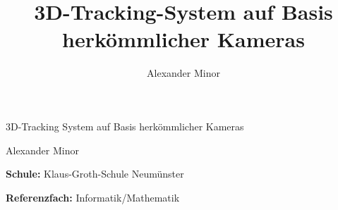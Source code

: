 \documentclass[12pt]{article}
\title{\Large{\textbf{3D-Tracking-System auf Basis herkömmlicher Kameras}}}
\author{Alexander Minor}
\begin{document}
\begin{titlepage}
  \begin{center}
    \vspace*{3cm}

    {\LARGE{3D-Tracking System auf Basis herkömmlicher Kameras}}

    \vspace{0.5cm}
    {\normalsize{Alexander Minor}}

    \vspace{3.5cm}

    \raggedright{\textbf{Schule:} Klaus-Groth-Schule Neumünster} \\
    \vspace{0.2cm}
    \raggedright{\textbf{Referenzfach:} Informatik/Mathematik} \\
    \vspace{0.2cm}

  \end{center}
\end{titlepage}

\newpage
\tableofcontents

\newpage
\end{document}
